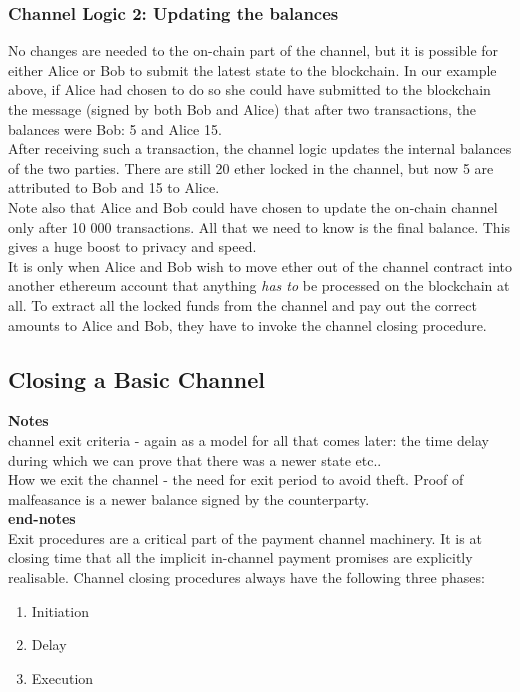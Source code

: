 \subsubsection*{Channel Logic 2: Updating the balances}
No changes are needed to the on-chain part of the channel, but it is possible for either Alice or Bob to submit the latest state to the blockchain. In our example above, if Alice had chosen to do so she could have submitted to the blockchain the message (signed by both Bob and Alice) that after two transactions, the balances were Bob: 5 and Alice 15. \\
After receiving such a transaction, the channel logic updates the internal balances of the two parties. There are still 20 ether locked in the channel, but now 5 are attributed to Bob and 15 to Alice.\\
Note also that Alice and Bob could have chosen to update the on-chain channel only after 10 000 transactions. All that we need to know is the final balance. This gives a huge boost to privacy and speed.\\
It is only when Alice and Bob wish to move ether out of the channel contract into another ethereum account that anything \textit{has to} be processed on the blockchain at all. To extract all the locked funds from the channel and pay out the correct amounts to Alice and Bob, they have to invoke the channel closing procedure.

\subsection{Closing a Basic Channel}
\textbf{Notes}\\
channel exit criteria - again as a model for all that comes later: the time delay during which we can prove that there was a newer state etc..\\
How we exit the channel - the need for exit period to avoid theft. Proof of malfeasance is a newer balance signed by the counterparty.\\
\textbf{end-notes}\\[2cm]

Exit procedures are a critical part of the payment channel machinery. It is at closing time that all the implicit in-channel payment promises are explicitly realisable. Channel closing procedures always have the following three phases:
\begin{enumerate}
 \item Initiation
 \item Delay
 \item Execution
\end{enumerate}

